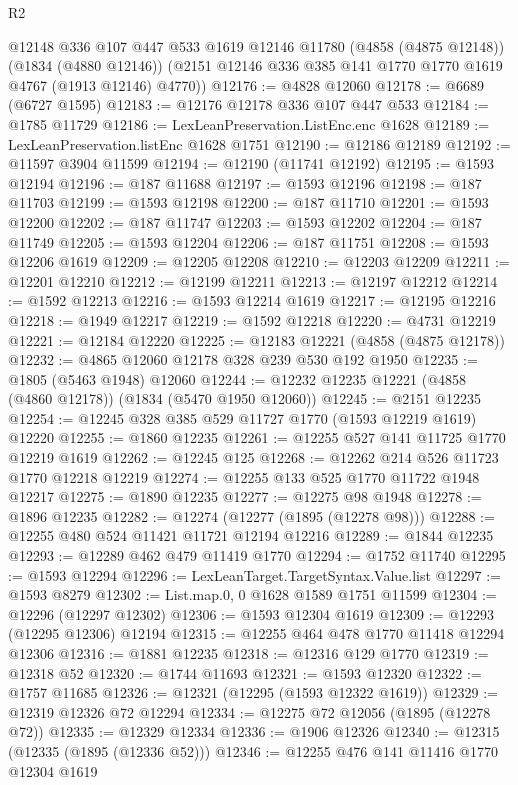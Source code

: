 \begin{lexlean}{R2}
\begin{coremodule}
      @12148
      @336
      @107
      @447
      @533
      @1619
      @12146
      @11780
      (@4858 (@4875 @12148))
      (@1834 (@4880 @12146))
      (@2151 @12146 @336 @385 @141 @1770 @1770 @1619 @4767 (@1913 @12146) @4770))
@12176 := @4828 @12060
@12178 := @6689 (@6727 @1595)
@12183 := @12176 @12178 @336 @107 @447 @533
@12184 := @1785 @11729
@12186 := LexLeanPreservation.ListEnc.enc @1628
@12189 := LexLeanPreservation.listEnc @1628 @1751
@12190 := @12186 @12189
@12192 := @11597 @3904 @11599
@12194 := @12190 (@11741 @12192)
@12195 := @1593 @12194
@12196 := @187 @11688
@12197 := @1593 @12196
@12198 := @187 @11703
@12199 := @1593 @12198
@12200 := @187 @11710
@12201 := @1593 @12200
@12202 := @187 @11747
@12203 := @1593 @12202
@12204 := @187 @11749
@12205 := @1593 @12204
@12206 := @187 @11751
@12208 := @1593 @12206 @1619
@12209 := @12205 @12208
@12210 := @12203 @12209
@12211 := @12201 @12210
@12212 := @12199 @12211
@12213 := @12197 @12212
@12214 := @1592 @12213
@12216 := @1593 @12214 @1619
@12217 := @12195 @12216
@12218 := @1949 @12217
@12219 := @1592 @12218
@12220 := @4731 @12219
@12221 := @12184 @12220
@12225 := @12183 @12221 (@4858 (@4875 @12178))
@12232 := @4865 @12060 @12178 @328 @239 @530 @192 @1950
@12235 := @1805 (@5463 @1948) @12060
@12244 := @12232 @12235 @12221 (@4858 (@4860 @12178)) (@1834 (@5470 @1950 @12060))
@12245 := @2151 @12235
@12254 := @12245 @328 @385 @529 @11727 @1770 (@1593 @12219 @1619) @12220
@12255 := @1860 @12235
@12261 := @12255 @527 @141 @11725 @1770 @12219 @1619
@12262 := @12245 @125
@12268 := @12262 @214 @526 @11723 @1770 @12218 @12219
@12274 := @12255 @133 @525 @1770 @11722 @1948 @12217
@12275 := @1890 @12235
@12277 := @12275 @98 @1948
@12278 := @1896 @12235
@12282 := @12274 (@12277 (@1895 (@12278 @98)))
@12288 := @12255 @480 @524 @11421 @11721 @12194 @12216
@12289 := @1844 @12235
@12293 := @12289 @462 @479 @11419 @1770
@12294 := @1752 @11740
@12295 := @1593 @12294
@12296 := LexLeanTarget.TargetSyntax.Value.list
@12297 := @1593 @8279
@12302 := List.map.{0, 0} @1628 @1589 @1751 @11599
@12304 := @12296 (@12297 @12302)
@12306 := @1593 @12304 @1619
@12309 := @12293 (@12295 @12306) @12194
@12315 := @12255 @464 @478 @1770 @11418 @12294 @12306
@12316 := @1881 @12235
@12318 := @12316 @129 @1770
@12319 := @12318 @52
@12320 := @1744 @11693
@12321 := @1593 @12320
@12322 := @1757 @11685
@12326 := @12321 (@12295 (@1593 @12322 @1619))
@12329 := @12319 @12326 @72 @12294
@12334 := @12275 @72 @12056 (@1895 (@12278 @72))
@12335 := @12329 @12334
@12336 := @1906 @12326
@12340 := @12315 (@12335 (@1895 (@12336 @52)))
@12346 := @12255 @476 @141 @11416 @1770 @12304 @1619

\end{coremodule}
\end{lexlean}
